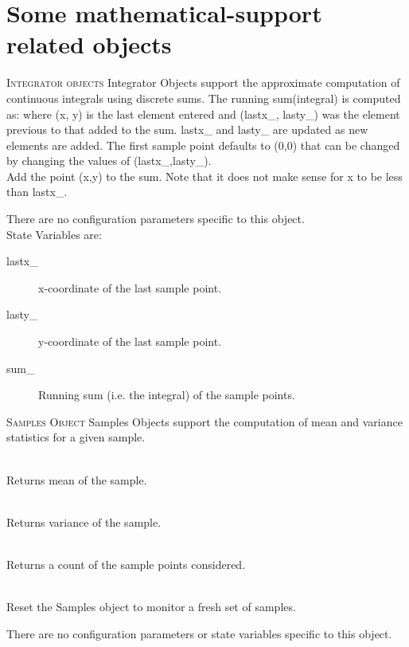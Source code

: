 \section{Some mathematical-support related objects}
\label{sec:mathobjects}

\textsc{Integrator objects}
Integrator Objects support the approximate computation of continuous
integrals using discrete sums. The running sum(integral) is computed as:
 where (x, y) is the last element
entered and
(lastx\_, lasty\_) was the element previous to that added to the sum.
lastx\_ and lasty\_ are updated as new elements are added. The first
sample point defaults to (0,0) that can be changed by changing the values
of (lastx\_,lasty\_). 
\\
Add the point (x,y) to the sum. Note that it does not make sense for x to
be less than lastx\_. 

There are no configuration parameters specific to this object. \\

State Variables are:
\begin{description}
\item[lastx\_]
x-coordinate of the last sample point. 

\item[lasty\_]
y-coordinate of the last sample point. 

\item[sum\_] Running sum (i.e. the integral) of the sample points. 
\end{description}


\textsc{Samples Object}
Samples Objects support the computation of mean and variance statistics
for a given sample. 

\\
Returns mean of the sample. 

\\
Returns variance of the sample. 

\\
Returns a count of the sample points considered. 

\\
Reset the Samples object to monitor a fresh set of samples. 

There are no configuration parameters or state variables specific to this
object. 



